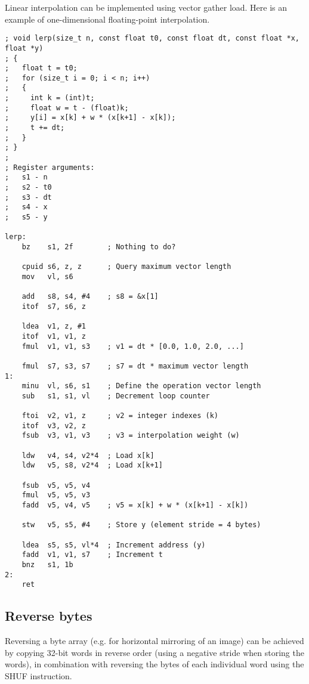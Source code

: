 Linear interpolation can be implemented using vector gather load. Here is an
example of one-dimensional floating-point interpolation.

\begin{lstlisting}[style=assembler]
; void lerp(size_t n, const float t0, const float dt, const float *x, float *y)
; {
;   float t = t0;
;   for (size_t i = 0; i < n; i++)
;   {
;     int k = (int)t;
;     float w = t - (float)k;
;     y[i] = x[k] + w * (x[k+1] - x[k]);
;     t += dt;
;   }
; }
;
; Register arguments:
;   s1 - n
;   s2 - t0
;   s3 - dt
;   s4 - x
;   s5 - y

lerp:
    bz    s1, 2f        ; Nothing to do?

    cpuid s6, z, z      ; Query maximum vector length
    mov   vl, s6

    add   s8, s4, #4    ; s8 = &x[1]
    itof  s7, s6, z

    ldea  v1, z, #1
    itof  v1, v1, z
    fmul  v1, v1, s3    ; v1 = dt * [0.0, 1.0, 2.0, ...]

    fmul  s7, s3, s7    ; s7 = dt * maximum vector length
1:
    minu  vl, s6, s1    ; Define the operation vector length
    sub   s1, s1, vl    ; Decrement loop counter

    ftoi  v2, v1, z     ; v2 = integer indexes (k)
    itof  v3, v2, z
    fsub  v3, v1, v3    ; v3 = interpolation weight (w)

    ldw   v4, s4, v2*4  ; Load x[k]
    ldw   v5, s8, v2*4  ; Load x[k+1]

    fsub  v5, v5, v4
    fmul  v5, v5, v3
    fadd  v5, v4, v5    ; v5 = x[k] + w * (x[k+1] - x[k])

    stw   v5, s5, #4    ; Store y (element stride = 4 bytes)

    ldea  s5, s5, vl*4  ; Increment address (y)
    fadd  v1, v1, s7    ; Increment t
    bnz   s1, 1b
2:
    ret
\end{lstlisting}

\subsection{Reverse bytes}

Reversing a byte array (e.g. for horizontal mirroring of an image) can be
achieved by copying 32-bit words in reverse order (using a negative stride when
storing the words), in combination with reversing the bytes of each individual
word using the SHUF instruction.

